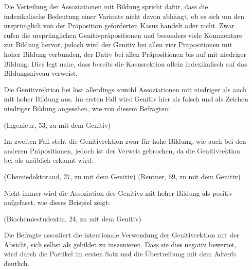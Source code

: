 Die Verteilung der Assoziationen mit Bildung spricht dafür, dass die indexikalische Bedeutung einer Variante nicht davon abhängt, ob es sich um den ursprünglich von der Präposition geforderten Kasus handelt oder nicht. 
Zwar rufen die ursprünglichen Genitivpräpositionen \waehrend{} und \wegen{} besonders viele Kommentare zur Bildung hervor, jedoch wird der Genitiv bei allen vier Präpositionen mit hoher Bildung verbunden, der Dativ bei allen Präpositionen bis auf \gegenueber{} mit niedriger Bildung. 
Dies legt nahe, dass bereits die Kasusrektion allein indexikalisch auf das Bildungsniveau verweist. 

Die Genitivrektion bei \gegenueber{} löst allerdings sowohl Assoziationen mit niedriger als auch mit hoher Bildung aus. 
Im ersten Fall wird Genitiv hier als falsch und als Zeichen niedriger Bildung angesehen, wie von diesem Befragten: 
\begin{exe}
\ex {} (Ingenieur, 53, zu \gegenueber{} mit dem Genitiv)
\end{exe}
Im zweiten Fall steht die Genitivrektion zwar für hohe Bildung, wie auch bei den anderen Präpositionen, jedoch ist der Verweis gebrochen, da die Genitivrektion bei \gegenueber{} als unüblich erkannt wird: 
\begin{exe}
\ex {} (Chemiedoktorand, 27, zu \gegenueber{} mit dem Genitiv) 
\ex {} (Rentner, 69, zu \gegenueber{} mit dem Genitiv)
\end{exe}
Nicht immer wird die Assoziation des Genitivs mit hoher Bildung als positiv aufgefasst, wie dieses Beispiel zeigt: 
\begin{exe}
\ex {} (Biochemiestudentin, 24, zu \wegen{} mit dem Genitiv)
\end{exe}
Die Befragte assoziiert die intentionale Verwendung der Genitivrektion mit der Absicht, sich selbst als gebildet zu inszenieren.
Dass sie dies negativ bewertet, wird durch die Partikel  im ersten Satz und die Übertreibung mit dem Adverb  deutlich.  

